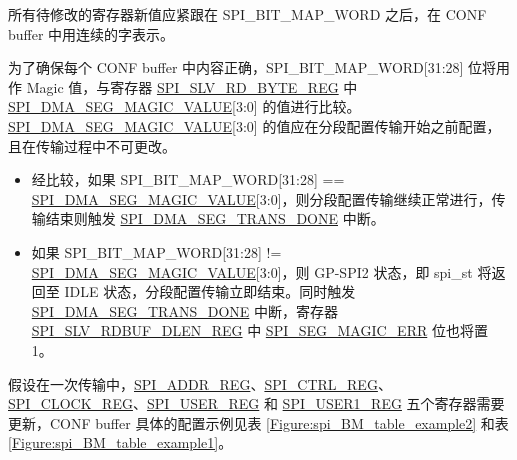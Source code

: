 \documentclass[main\_\_CN.tex]{subfiles}
\begin{document}
所有待修改的寄存器新值应紧跟在 SPI\_BIT\_MAP\_WORD 之后，在 CONF buffer 中用连续的字表示。

为了确保每个 CONF buffer 中内容正确，SPI\_BIT\_MAP\_WORD[31:28] 位将用作 Magic 值，与寄存器 \hyperref[regdesc:SPISLVRDBYTEREG]{SPI\_SLV\_RD\_BYTE\_REG} 中 \hyperref[fielddesc:SPIDMASEGMAGICVALUE]{SPI\_DMA\_SEG\_MAGIC\_VALUE}[3:0] 的值进行比较。\hyperref[fielddesc:SPIDMASEGMAGICVALUE]{SPI\_DMA\_SEG\_MAGIC\_VALUE}[3:0] 的值应在分段配置传输开始之前配置，且在传输过程中不可更改。

\begin{itemize}
        \item 经比较，如果 SPI\_BIT\_MAP\_WORD[31:28] == \hyperref[fielddesc:SPIDMASEGMAGICVALUE]{SPI\_DMA\_SEG\_MAGIC\_VALUE}[3:0]，则分段配置传输继续正常进行，传输结束则触发 \hyperref[fielddesc:SPIDMASEGTRANSDONE]{SPI\_DMA\_SEG\_TRANS\_DONE} 中断。
        \item 如果 SPI\_BIT\_MAP\_WORD[31:28] != \hyperref[fielddesc:SPIDMASEGMAGICVALUE]{SPI\_DMA\_SEG\_MAGIC\_VALUE}[3:0]，则 GP-SPI2 状态，即 spi\_st 将返回至 IDLE 状态，分段配置传输立即结束。同时触发 \hyperref[fielddesc:SPIDMASEGTRANSDONE]{SPI\_DMA\_SEG\_TRANS\_DONE} 中断，寄存器 \hyperref[regdesc:SPISLVRDBUFDLENREG]{SPI\_SLV\_RDBUF\_DLEN\_REG} 中 \hyperref[fielddesc:SPISEGMAGICERR]{SPI\_SEG\_MAGIC\_ERR} 位也将置 1。
    \end{itemize}

假设在一次传输中，\hyperref[regdesc:SPIADDRREG]{SPI\_ADDR\_REG}、\hyperref[regdesc:SPICTRLREG]{SPI\_CTRL\_REG}、\hyperref[regdesc:SPICLOCKREG]{SPI\_CLOCK\_REG}、\hyperref[regdesc:SPIUSERREG]{SPI\_USER\_REG} 和 \hyperref[regdesc:SPIUSER1REG]{SPI\_USER1\_REG} 五个寄存器需要更新，CONF buffer 具体的配置示例见表 \ref{Figure:spi_BM_table_example2} 和表 \ref{Figure:spi_BM_table_example1}。
\end{document}
